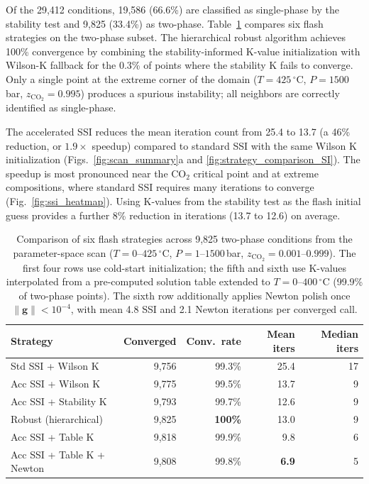 \documentclass[preprint,12pt,authoryear]{elsarticle}
\begin{document}
Of the 29{,}412 conditions, 19{,}586 (66.6\%) are classified as single-phase by the
stability test and 9{,}825 (33.4\%) as two-phase.
Table~\ref{tab:accel_comparison} compares six flash strategies on the
two-phase subset.
The hierarchical robust algorithm achieves 100\% convergence by combining the
stability-informed K-value initialization with Wilson-K fallback for the
0.3\% of points where the stability K fails to converge.
Only a single point at the extreme corner of the domain ($T = 425\,^\circ$C,
$P = 1500$\,bar, $z_{\text{CO}_2} = 0.995$) produces a spurious instability;
all neighbors are correctly identified as single-phase.


The accelerated SSI reduces the mean iteration count from 25.4 to 13.7
(a 46\% reduction, or $1.9\times$ speedup) compared to standard SSI with the same
Wilson K initialization (Figs.~\ref{fig:scan_summary}a and \ref{fig:strategy_comparison_SI}).
The speedup is most pronounced near the CO$_2$ critical point and at extreme
compositions, where standard SSI requires many iterations to converge
(Fig.~\ref{fig:ssi_heatmap}).
Using K-values from the stability test as the flash initial guess provides a further
8\% reduction in iterations (13.7 to 12.6) on average.


\begin{table}[H]
  \centering
  \caption{Comparison of six flash strategies across 9{,}825 two-phase conditions
           from the parameter-space scan ($T = 0$--$425\,^\circ$C, $P = 1$--$1500$\,bar,
           $z_{\text{CO}_2} = 0.001$--$0.999$).
           The first four rows use cold-start initialization;
           the fifth and sixth use K-values interpolated from a pre-computed solution table
           extended to $T = 0$--$400\,^\circ$C (99.9\% of two-phase points).
           The sixth row additionally applies Newton polish once $\|\mathbf{g}\| < 10^{-4}$,
           with mean 4.8 SSI and 2.1 Newton iterations per converged call.}
  \label{tab:accel_comparison}
  \begin{tabular}{lrrrr}
    \toprule
    Strategy & Converged & Conv.\ rate & Mean iters & Median iters \\
    \midrule
    Std SSI + Wilson K           & 9{,}756 & 99.3\%  & 25.4 & 17 \\
    Acc SSI + Wilson K           & 9{,}775 & 99.5\%  & 13.7 &  9 \\
    Acc SSI + Stability K        & 9{,}793 & 99.7\%  & 12.6 &  9 \\
    Robust (hierarchical)        & 9{,}825 & \textbf{100\%} & 13.0 &  9 \\
    \midrule
    Acc SSI + Table K            & 9{,}818 & 99.9\%  &  9.8 &  6 \\
    Acc SSI + Table K + Newton   & 9{,}808 & 99.8\%  &  \textbf{6.9} &  5 \\
    \bottomrule
  \end{tabular}
\end{table}
\end{document}
